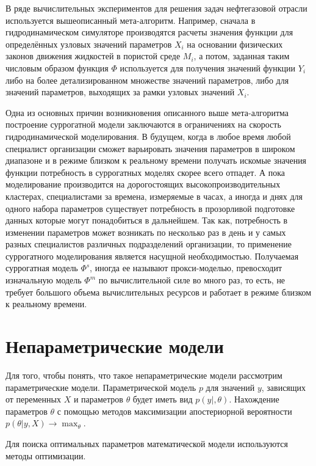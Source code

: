 В ряде вычислительных экспериментов для решения задач нефтегазовой отрасли используется вышеописанный мета-алгоритм. 
Например, сначала в гидродинамическом симуляторе производятся расчеты значения функции для определённых узловых значений параметров $X_i$ на основании физических законов движения жидкостей в пористой среде $M_i$, а потом, заданная таким числовым образом функция $\Phi$ используется для получения значений функции $Y_i$  либо на более детализированном множестве значений параметров, либо для значений параметров, выходящих за рамки узловых значений $X_i$.

Одна из основных причин возникновения описанного выше мета-алгоритма построение суррогатной модели заключаются в ограничениях на скорость гидродинамической моделирования. 
В будущем, когда в любое время любой специалист организации сможет варьировать значения параметров в широком диапазоне и в режиме близком к реальному времени получать искомые значения функции потребность в суррогатных моделях скорее всего отпадет.
А пока моделирование производится на дорогостоящих высокопроизводительных кластерах, специалистами за времена, измеряемые в часах, а иногда и днях для одного набора параметров существует потребность в прозорливой подготовке данных которые могут понадобиться в дальнейшем.
Так как, потребность в изменении параметров может возникать по несколько раз в день и у самых разных специалистов различных подразделений организации, то применение суррогатного моделирования является насущной необходимостью.
Получаемая суррогатная модель $\Phi^s$, иногда ее называют прокси-моделью, превосходит изначальную модель $\Phi^m$ по вычислительной силе во много раз, то есть, не требует большого объема вычислительных ресурсов и работает в режиме близком к реальному времени.

\section{Непараметрические модели}
Для того, чтобы понять, что такое непараметрические модели рассмотрим параметрические модели. 
Параметрической модель $p$ для значений $y$, зависящих от переменных $X$  и параметров $\theta$  будет иметь вид  $p \left( y\vert	,\theta \right)$.
Нахождение  параметров $\theta$ с помощью методов максимизации апостериорной вероятности $p \left( \theta \vert y,X \right)  \longrightarrow \max_\theta $.

Для поиска оптимальных параметров математической модели используются методы оптимизации.

